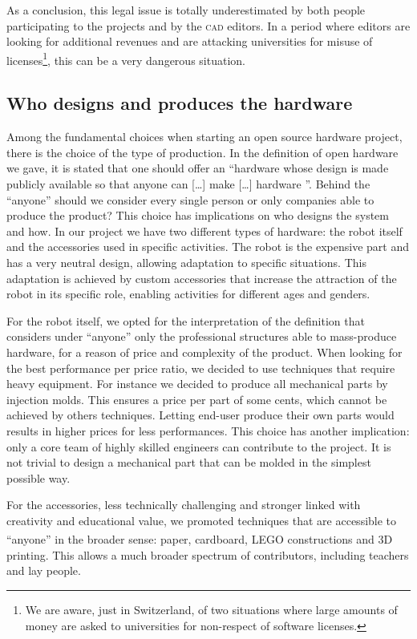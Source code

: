 \documentclass[letterpaper, 10 pt, conference]{ieeeconf}  %
\begin{document}
As a conclusion, this legal issue is totally underestimated by both people participating to the projects and by the \textsc{cad} editors. 
In a period where editors are looking for additional revenues and are attacking universities for misuse of licenses\footnote{We are aware, just in Switzerland, of two situations where large amounts of money are asked to universities for non-respect of software licenses.}, this can be a very dangerous situation.

\subsection{Who designs and produces the hardware}

Among the fundamental choices when starting an open source hardware project, there is the choice of the type of production. 
In the definition of open hardware we gave, it is stated that one should offer an ``hardware whose design is made publicly available so that anyone can [\dots] make [\dots] hardware ''.
Behind the ``anyone'' should we consider every single person or only companies able to produce the product?
This choice has implications on who designs the system and how.
In our project we have two different types of hardware: the robot itself and the accessories used in specific activities.
The robot is the expensive part and has a very neutral design, allowing adaptation to specific situations.
This adaptation is achieved by custom accessories that increase the attraction of the robot in its specific role, enabling activities for different ages and genders.

For the robot itself, we opted for the interpretation of the definition that considers under ``anyone'' only the professional structures able to mass-produce hardware, for a reason of price and complexity of the product. 
When looking for the best performance per price ratio, we decided to use techniques that require heavy equipment.
For instance we decided to produce all mechanical parts by injection molds. 
This ensures a price per part of some cents, which cannot be achieved by others techniques.
Letting end-user produce their own parts would results in higher prices for less performances. 
This choice has another implication: only a core team of highly skilled engineers can contribute to the project. 
It is not trivial to design a mechanical part that can be molded in the simplest possible way.

For the accessories, less technically challenging and stronger linked with creativity and educational value, we promoted techniques that are accessible to ``anyone'' in the broader sense: paper, cardboard, LEGO\textsuperscript{\textregistered} constructions and 3D printing. %
This allows a much broader spectrum of contributors, including teachers and lay people.
\end{document}
